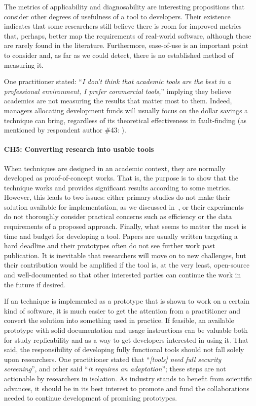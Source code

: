 The metrics of applicability and diagnosability  are interesting propositions that consider other degrees of usefulness of a tool to developers.
Their existence indicates that some researchers still believe there is room for improved metrics that, perhaps, better map the requirements of real-world software, although these are rarely found in the literature.
Furthermore, ease-of-use is an important point to consider and, as far as we could detect, there is no established method of measuring it.

One practitioner stated: ``\textit{I don't think that academic tools are the best in a professional environment, I prefer commercial tools,}'' implying they believe academics are not measuring the results that matter most to them.
Indeed, managers allocating development funds will usually focus on the dollar savings a technique can bring, regardless of its theoretical effectiveness in fault-finding (as mentioned by respondent author \#43: ).

\paragraph{CH5: Converting research into usable tools}
When techniques are designed in an academic context, they are normally developed as proof-of-concept works.
That is, the purpose is to show that the technique works and provides significant results according to some metrics.
However, this leads to two issues: either primary studies do not make their solution available for implementation, as we discussed in~, or their experiments do not thoroughly consider practical concerns such as efficiency or the data requirements of a proposed approach.
Finally, what seems to matter the most is time and budget for developing a tool.
Papers are usually written targeting a hard deadline and their prototypes often do not see further work past publication.
It is inevitable that researchers will move on to new challenges, but their contribution would be amplified if the tool is, at the very least, open-source and well-documented so that other interested parties can continue the work in the future if desired.

If an \rt technique is implemented as a prototype that is shown to work on a certain kind of software, it is much easier to get the attention from a practitioner and convert the solution into something used in practice.
If feasible, an available prototype with solid documentation and usage instructions can be valuable both for study replicability and as a way to get developers interested in using it.
That said, the responsibility of developing fully functional tools should not fall solely upon researchers.
One practitioner stated that ``\textit{[\rt tools] need full security screening}'', and other said ``\textit{it requires an adaptation}''; these steps are not actionable by researchers in isolation.
As industry stands to benefit from scientific advances, it should be in its best interest to promote and fund the collaborations needed to continue development of promising prototypes.

